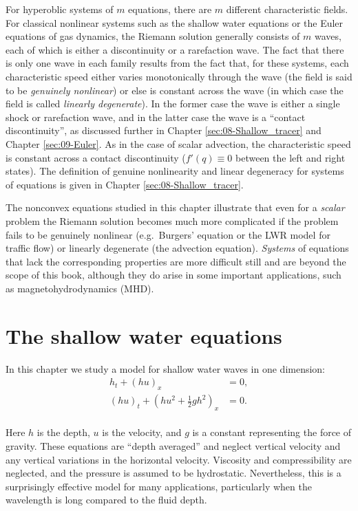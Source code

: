 \documentclass{SIAMbook2016}
\begin{document}
For hyperoblic systems of \(m\) equations, there are \(m\) different
characteristic fields. For classical nonlinear systems such as the
shallow water equations or the Euler equations of gas dynamics, the
Riemann solution generally consists of \(m\) waves, each of which is
either a discontinuity or a rarefaction wave. The fact that there is
only one wave in each family results from the fact that, for these
systems, each characteristic speed either varies monotonically through
the wave (the field is said to be \emph{genuinely nonlinear}) or else is
constant across the wave (in which case the field is called
\emph{linearly degenerate}). In the former case the wave is either a
single shock or rarefaction wave, and in the latter case the wave is a
``contact discontinuity'', as discussed further in
Chapter \ref{sec:08-Shallow_tracer} and Chapter \ref{sec:09-Euler}. As
in the case of scalar advection, the characteristic speed is constant
across a contact discontinuity (\(f'(q) \equiv 0\) between the left and
right states). The definition of genuine nonlinearity and linear
degeneracy for systems of equations is given in
Chapter \ref{sec:08-Shallow_tracer}.

The nonconvex equations studied in this chapter illustrate that even for
a \emph{scalar} problem the Riemann solution becomes much more
complicated if the problem fails to be genuinely nonlinear
(e.g.~Burgers' equation or the LWR model for traffic flow) or linearly
degenerate (the advection equation). \emph{Systems} of equations that
lack the corresponding properties are more difficult still and are
beyond the scope of this book, although they do arise in some important
applications, such as magnetohydrodynamics (MHD).

\hypertarget{the-shallow-water-equations}{%
\chapter{The shallow water
equations}\label{the-shallow-water-equations}}
\label{sec:07-Shallow_water}

In this chapter we study a model for shallow water waves in one
dimension:\\
\begin{align}
    h_t + (hu)_x & = 0, \label{SW_mass} \\
    (hu)_t + \left(hu^2 + \frac{1}{2}gh^2\right)_x & = 0. \label{SW_mom}
\end{align}\\
Here \(h\) is the depth, \(u\) is the velocity, and \(g\) is a constant
representing the force of gravity. These equations are ``depth
averaged'' and neglect vertical velocity and any vertical variations in
the horizontal velocity. Viscosity and compressibility are neglected,
and the pressure is assumed to be hydrostatic. Nevertheless, this is a
surprisingly effective model for many applications, particularly when
the wavelength is long compared to the fluid depth.
\end{document}
